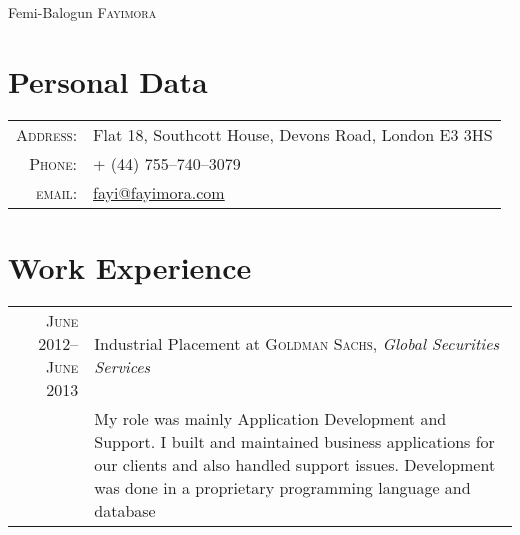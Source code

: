 \documentclass[a4paper,10pt]{article}
\begin{document}
\pagestyle{empty} %


\par{\centering
  {\Huge Femi-Balogun \textsc{Fayimora}
}\bigskip\par}

\section{Personal Data}

\begin{tabular}{rl}
  \textsc{Address:}   & Flat 18, Southcott House, Devons Road, London E3 3HS \\
  \textsc{Phone:}     & + (44) 755--740--3079 \\
  \textsc{email:}     & \href{mailto:fayi@fayimora.com}{fayi@fayimora.com}
\end{tabular}

\section{Work Experience}
\begin{tabular}{r|p{11cm}}
  \textsc{June 2012--June 2013} & Industrial Placement at \textsc{Goldman Sachs}, \emph{Global
  Securities Services}\\&

  \footnotesize{My role was mainly Application Development and Support. I built and maintained
    business applications for our clients and also handled support issues. Development was done
    in a proprietary programming language and database}
\end{tabular}

\end{document}
